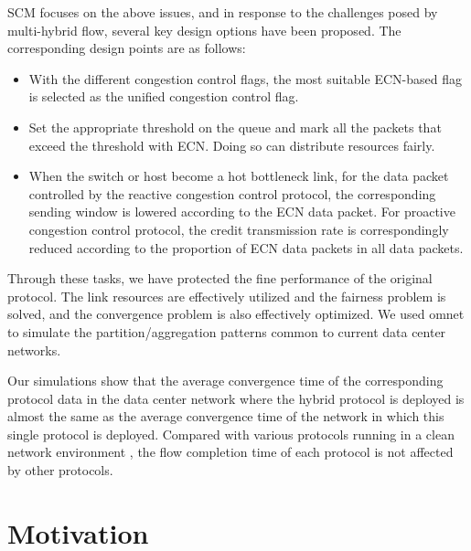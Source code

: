 \documentclass[conference]{IEEEtran}
\begin{document}
\indent SCM focuses on the above issues, and in response to the challenges posed by multi-hybrid flow, several key design options have been proposed. The corresponding design points are as follows:

\begin{itemize}

\item With the different congestion control flags, the most suitable ECN-based flag is selected as the unified congestion control flag.

\item Set the appropriate threshold on the queue and mark all the packets that exceed the threshold with ECN. Doing so can distribute resources fairly.

\item When the switch or host become a hot bottleneck link, for the data packet controlled by the reactive congestion control protocol, the corresponding sending window is lowered according to the ECN data packet. For proactive congestion control protocol, the credit transmission rate is correspondingly reduced according to the proportion of ECN data packets in all data packets.

\end{itemize}

\indent Through these tasks, we have protected the fine performance of the original protocol. The link resources are effectively utilized and the fairness problem is solved, and the convergence problem is also effectively optimized. We used omnet to simulate the partition/aggregation patterns common to current data center networks.

\indent Our simulations show that the average convergence time of the corresponding protocol data in the data center network where the hybrid protocol is deployed is almost the same as the average convergence time of the network in which this single protocol is deployed. Compared with various protocols running in a clean network environment , the flow completion time of each protocol is not affected by other protocols.

\section{Motivation}
\end{document}
